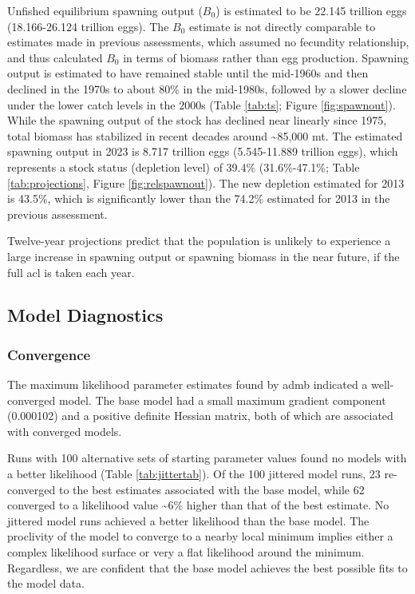 \documentclass[11pt,
  letterpaper,
]{article}
\begin{document}
Unfished equilibrium spawning output (\(B_0\)) is estimated to be 22.145 trillion eggs (18.166-26.124 trillion eggs). The \(B_0\) estimate is not directly comparable to estimates made in previous assessments, which assumed no fecundity relationship, and thus calculated \(B_0\) in terms of biomass rather than egg production. Spawning output is estimated to have remained stable until the mid-1960s and then declined in the 1970s to about 80\% in the mid-1980s, followed by a slower decline under the lower catch levels in the 2000s (Table \ref{tab:ts}; Figure \ref{fig:spawnout}). While the spawning output of the stock has declined near linearly since 1975, total biomass has stabilized in recent decades around \textasciitilde85,000 mt. The estimated spawning output in 2023 is 8.717 trillion eggs (5.545-11.889 trillion eggs), which represents a stock status (depletion level) of 39.4\% (31.6\%-47.1\%; Table \ref{tab:projections}, Figure \ref{fig:relspawnout}). The new depletion estimated for 2013 is 43.5\%, which is significantly lower than the 74.2\% estimated for 2013 in the previous assessment.

Twelve-year projections predict that the population is unlikely to experience a large increase in spawning output or spawning biomass in the near future, if the full \gls{acl} is taken each year.

\hypertarget{model-diagnostics}{%
\subsection{Model Diagnostics}\label{model-diagnostics}}

\hypertarget{convergence}{%
\subsubsection{Convergence}\label{convergence}}

The maximum likelihood parameter estimates found by \gls{admb} indicated a well-converged model. The base model had a small maximum gradient component (0.000102) and a positive definite Hessian matrix, both of which are associated with converged models.

Runs with 100 alternative sets of starting parameter values found no models with a better likelihood (Table \ref{tab:jittertab}). Of the 100 jittered model runs, 23 re-converged to the best estimates associated with the base model, while 62 converged to a likelihood value \textasciitilde6\% higher than that of the best estimate. No jittered model runs achieved a better likelihood than the base model. The proclivity of the model to converge to a nearby local minimum implies either a complex likelihood surface or very a flat likelihood around the minimum. Regardless, we are confident that the base model achieves the best possible fits to the model data.
\end{document}
